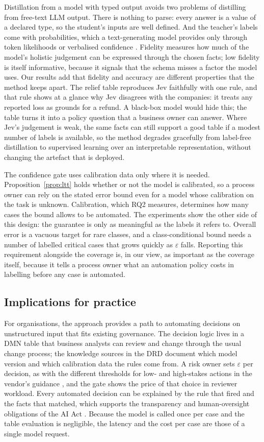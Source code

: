 \documentclass[a4paper,fleqn]{cas-sc}
\theoremstyle{definition}
\newcommand{\jev}{Jev}
\begin{document}
Distillation from a model with typed output avoids two problems of distilling from free-text LLM output. There is nothing to parse: every answer is a value of a declared type, so the student's inputs are well defined. And the teacher's labels come with probabilities, which a text-generating model provides only through token likelihoods or verbalised confidence \citep{kadavath2022,xiong2024}. Fidelity measures how much of the model's holistic judgement can be expressed through the chosen facts; low fidelity is itself informative, because it signals that the schema misses a factor the model uses. Our results add that fidelity and accuracy are different properties that the method keeps apart. The relief table reproduces \jev{} faithfully with one rule, and that rule shows at a glance why \jev{} disagrees with the companies: it treats any reported loss as grounds for a refund. A black-box model would hide this; the table turns it into a policy question that a business owner can answer. Where \jev{}'s judgement is weak, the same facts can still support a good table if a modest number of labels is available, so the method degrades gracefully from label-free distillation to supervised learning over an interpretable representation, without changing the artefact that is deployed.

The confidence gate uses calibration data only where it is needed. Proposition~\ref{prop:ltt} holds whether or not the model is calibrated, so a process owner can rely on the stated error bound even for a model whose calibration on the task is unknown. Calibration, which RQ2 measures, determines how many cases the bound allows to be automated. The experiments show the other side of this design: the guarantee is only as meaningful as the labels it refers to. Overall error is a vacuous target for rare classes, and a class-conditional bound needs a number of labelled critical cases that grows quickly as $\varepsilon$ falls. Reporting this requirement alongside the coverage is, in our view, as important as the coverage itself, because it tells a process owner what an automation policy costs in labelling before any case is automated.

\subsection{Implications for practice}
For organisations, the approach provides a path to automating decisions on unstructured input that fits existing governance. The decision logic lives in a DMN table that business analysts can review and change through the usual change process; the knowledge sources in the DRD document which model version and which calibration data the rules come from. A risk owner sets $\varepsilon$ per decision, as with the different thresholds for low- and high-stakes actions in the vendor's guidance \citep{typesafe2026docs}, and the gate shows the price of that choice in reviewer workload. Every automated decision can be explained by the rule that fired and the facts that matched, which supports the transparency and human-oversight obligations of the AI Act \citep{euaiact2024}. Because the model is called once per case and the table evaluation is negligible, the latency and the cost per case are those of a single model request.
\end{document}
